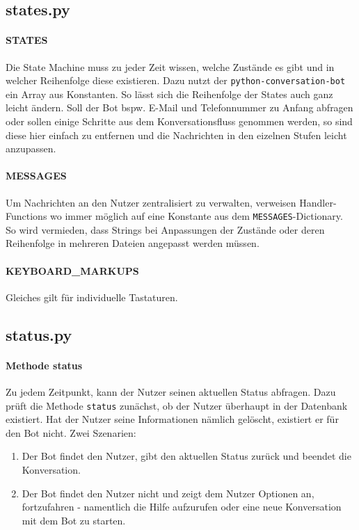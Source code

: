         \subsection{states.py} \label{states.py}
            \paragraph{STATES}
                Die State Machine muss zu jeder Zeit wissen, welche Zustände es gibt und in welcher Reihenfolge diese existieren. Dazu nutzt der \verb|python-conversation-bot| \cite{conversationBot} ein Array aus Konstanten. So lässt sich die Reihenfolge der States auch ganz leicht ändern. Soll der Bot bspw. E-Mail und Telefonnummer zu Anfang abfragen oder sollen einige Schritte aus dem Konversationsfluss genommen werden, so sind diese hier einfach zu entfernen und die Nachrichten in den eizelnen Stufen leicht anzupassen.

            \paragraph{MESSAGES}
                Um Nachrichten an den Nutzer zentralisiert zu verwalten, verweisen Handler-Functions wo immer möglich auf eine Konstante aus dem \verb|MESSAGES|-Dictionary. So wird vermieden, dass Strings bei Anpassungen der Zustände oder deren Reihenfolge in mehreren Dateien angepasst werden müssen.
            
            \paragraph{KEYBOARD\_MARKUPS}
                Gleiches gilt für individuelle Tastaturen. 

        \subsection{status.py} \label{status.py}
            \paragraph{Methode status}
                Zu jedem Zeitpunkt, kann der Nutzer seinen aktuellen Status abfragen. Dazu prüft die Methode \verb|status| zunächst, ob der Nutzer überhaupt in der Datenbank existiert. Hat der Nutzer seine Informationen nämlich gelöscht, existiert er für den Bot nicht. Zwei Szenarien: 
                \begin{enumerate}
                    \item Der Bot findet den Nutzer, gibt den aktuellen Status zurück und beendet die Konversation.
                    \item Der Bot findet den Nutzer nicht und zeigt dem Nutzer Optionen an, fortzufahren - namentlich die Hilfe aufzurufen oder eine neue Konversation mit dem Bot zu starten.
                \end{enumerate}
        

